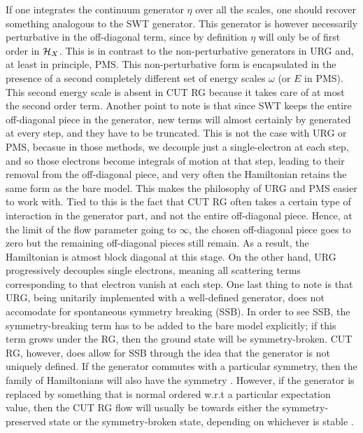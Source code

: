 \documentclass[12pt,twoside]{article}
\numberwithin{equation}{section}
\begin{document}
\pb If one integrates the continuum generator \(\eta\) over all the scales, one should recover something analogous to the SWT generator. This generator is however necessarily perturbative in the off-diagonal term, since by definition \(\eta\) will only be of first order in \(\mathcal{H}_X\). This is in contrast to the non-perturbative generators in URG and, at least in principle, PMS. This non-perturbative form is encapsulated in the presence of a second completely different set of energy scales \(\omega\) (or \(E\) in PMS). This second energy scale is absent in CUT RG because it takes care of at most the second order term.
\pb Another point to note is that since SWT keeps the entire off-diagonal piece in the generator, new terms will almost certainly by generated at every step, and they have to be truncated. This is not the case with URG or PMS, becasue in those methods, we decouple just a single-electron at each step, and so those electrons become integrals of motion at that step, leading to their removal from the off-diagonal piece, and very often the Hamiltonian retains the same form as the bare model. This makes the philosophy of URG and PMS easier to work with. Tied to this is the fact that CUT RG often takes a certain type of interaction in the generator part, and not the entire off-diagonal piece. Hence, at the limit of the flow parameter going to \(\infty\), the chosen off-diagonal piece goes to zero but the remaining off-diagonal pieces still remain. As a result, the Hamiltonian is atmost block diagonal at this stage. On the other hand, URG progressively decouples single electrons, meaning all scattering terms corresponding to that electron vanish at each step. 
\pb One last thing to note is that URG, being unitarily implemented with a well-defined generator, does not accomodate for spontaneous symmetry breaking (SSB). In order to see SSB, the symmetry-breaking term has to be added to the bare model explicitly; if this term grows under the RG, then the ground state will be symmetry-broken. CUT RG, however, does allow for SSB through the idea that the generator is not uniquely defined. If the generator commutes with a particular symmetry, then the family of Hamiltonians will also have the symmetry \cite{kehrein}. However, if the generator is replaced by something that is normal ordered w.r.t a particular expectation value, then the CUT RG flow will usually be towards either the symmetry-preserved state or the symmetry-broken state, depending on whichever is stable \cite{wegner_normal}.
\end{document}
